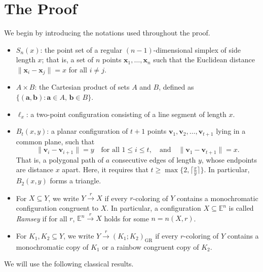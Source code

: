 \documentclass[11pt]{article}
\theoremstyle{definition}
\newcommand{\ceil}[1]{\lceil #1\rceil}
\begin{document}
 

\section{The Proof}
We begin by introducing the notations used throughout the proof.

\begin{itemize}
    \item \( S_n(x) \): the point set of a regular \((n{-}1)\)-dimensional simplex of side length \(x\); that is, a set of \(n\) points \(\boldsymbol{x}_1, \dots, \boldsymbol{x}_n\) such that the Euclidean distance \(\|\boldsymbol{x}_i - \boldsymbol{x}_j\| = x\) for all \(i \neq j\).

    \item \( A \times B \): the Cartesian product of sets \(A\) and \(B\), defined as \(\{(\boldsymbol{a}, \boldsymbol{b}) : \boldsymbol{a} \in A,\, \boldsymbol{b} \in B\}\).

    \item \( \ell_x \): a two-point configuration consisting of a line segment of length \(x\).

    \item \( B_t(x, y) \): a planar configuration of \(t + 1\) points \(\boldsymbol{v}_1, \boldsymbol{v}_2, \ldots, \boldsymbol{v}_{t+1}\) lying in a common plane, such that
    \[
        \|\boldsymbol{v}_i - \boldsymbol{v}_{i+1}\| = y \quad \text{for all } 1 \le i \le t, \quad \text{and} \quad \|\boldsymbol{v}_1 - \boldsymbol{v}_{t+1}\| = x.
    \]
    That is, a polygonal path of \(a\) consecutive edges of length \(y\), whose endpoints are distance \(x\) apart. Here, it requires that \(t\ge\max\{2,\ceil{\frac{x}{y}}\}\). In particular, \(B_2(x, y)\) forms a triangle.

    \item For \(X \subseteq Y\), we write \(Y \overset{r}{\rightarrow} X\) if every \(r\)-coloring of \(Y\) contains a monochromatic configuration congruent to \(X\). In particular, a configuration \(X \subseteq \mathbb{E}^n\) is called \emph{Ramsey} if for all \(r\), \(\mathbb{E}^n \overset{r}{\rightarrow} X\) holds for some \(n = n(X, r)\).
    \item For \(K_{1},K_{2} \subseteq Y\), we write \(Y \overset{r}{\rightarrow} (K_1; K_2)_{\mathrm{GR}}\) if every \(r\)-coloring of \(Y\) contains a monochromatic copy of \(K_1\) or a rainbow congruent copy of \(K_2\).
\end{itemize}

We will use the following classical results.
\end{document}
